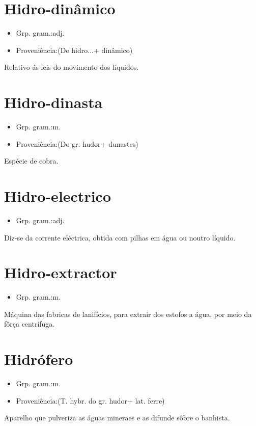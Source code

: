 \documentclass{article}
\begin{document}
\section{Hidro-dinâmico}
\begin{itemize}
\item {Grp. gram.:adj.}
\end{itemize}
\begin{itemize}
\item {Proveniência:(De \textunderscore hidro...\textunderscore  + \textunderscore dinâmico\textunderscore )}
\end{itemize}
Relativo ás leis do movimento dos líquidos.
\section{Hidro-dinasta}
\begin{itemize}
\item {Grp. gram.:m.}
\end{itemize}
\begin{itemize}
\item {Proveniência:(Do gr. \textunderscore hudor\textunderscore  + \textunderscore dunastes\textunderscore )}
\end{itemize}
Espécie de cobra.
\section{Hidro-electrico}
\begin{itemize}
\item {Grp. gram.:adj.}
\end{itemize}
Diz-se da corrente eléctrica, obtida com pilhas em água ou noutro líquido.
\section{Hidro-extractor}
\begin{itemize}
\item {Grp. gram.:m.}
\end{itemize}
Máquina das fabricas de lanifícios, para extrair dos estofos a água, por meio da fôrça centrífuga.
\section{Hidrófero}
\begin{itemize}
\item {Grp. gram.:m.}
\end{itemize}
\begin{itemize}
\item {Proveniência:(T. hybr. do gr. \textunderscore hudor\textunderscore  + lat. \textunderscore ferre\textunderscore )}
\end{itemize}
Aparelho que pulveriza as águas mineraes e as difunde sôbre o banhista.
\end{document}
